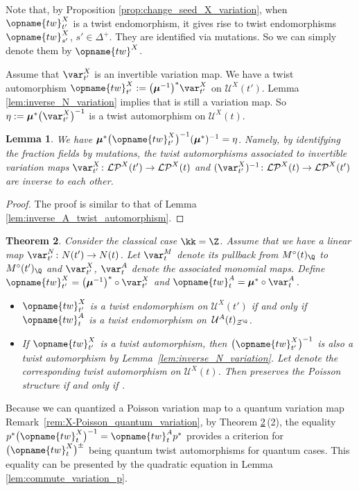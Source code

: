 \documentclass[pdftex]{sigma}
\renewcommand{\tw}{\opname{tw}}
\newcommand{\Mc}{M^\circ}
\newcommand{\upClAlg}{\mathcal{U}^A}
\newcommand{\XClAlg}{\mathcal{U}^X}
\newcommand{\LP}{{\mathcal{LP}}}
\newcommand{\fFac}{\mathcal{Z}}
\newcommand{\fFacRoot}{\fFac^{\Q}}
\newcommand{\seq}{\boldsymbol{\mu}}%
\renewcommand{\tw}{\opname{tw}}
\numberwithin{equation}{section}
\newtheorem{Theorem}{Theorem}[section]
\newtheorem{Lemma}[Theorem]{Lemma}
\begin{document}
Note that, by Proposition \ref{prop:change_seed_X_variation}, when
$\tw_{t'}^{X}$ is a twist endomorphism, it gives rise to twist endomorphisms
$\tw_{s'}^{X}$, $s'\in\Delta^{+}$. They are identified via mutations.
So we can simply denote them by $\tw^{X}$.

Assume that $\var_{t'}^{X}$ is an invertible variation map. We have
a twist automorphism $\tw_{t'}^{X}:=\big(\seq^{-1}\big)^{*}\var_{t'}^{X}$
on $\XClAlg(t')$. Lemma \ref{lem:inverse_N_variation} implies that
 is still a variation map. So $\eta:=\allowbreak\smash{\seq^{*}\bigl(\var_{t'}^{X}\bigr)^{-1}}$
is a twist automorphism on $\XClAlg(t)$.

\begin{Lemma}\label{lem:inverse_X_twist_automorphism}
We have $\seq^{*}\bigl(\tw_{t'}^{X}\bigr)^{-1}(\seq^{*})^{-1}=\eta$. Namely,
by identifying the fraction fields by mutations, the twist automorphisms
associated to invertible variation maps $\var_{t'}^{X}\colon\LP^{X}(t')\rightarrow\LP^{X}(t)$
and $(\var_{t'}^{X})^{-1}\colon\LP^{X}(t)\rightarrow\LP^{X}(t')$ are inverse
to each other.
\end{Lemma}

\begin{proof}
The proof is similar to that of Lemma \ref{lem:inverse_A_twist_automorphism}.
\end{proof}

\begin{Theorem}\label{thm:twist_X}
Consider the classical case $\kk=\Z$. Assume that we have a linear map $\var_{t'}^{N}\colon N(t')\rightarrow N(t)$.
Let $\var_{t}^{M}$ denote its pullback from $\Mc(t)_{\Q}$ to $\Mc(t')_{\Q}$ and $\var_{t'}^X$, $\var_t^A$ denote the associated monomial maps.
Define $\tw_{t'}^{X}=\big(\seq^{-1}\big)^{*}\circ\var_{t'}^{X}$ and $\tw_{t}^{A}=\seq^{*}\circ\var_{t}^{A}$.
\begin{itemize}\itemsep=0pt
\item[$(1)$] $\tw_{t'}^{X}$ is a twist endomorphism on $\XClAlg(t')$
if and only if $\tw_{t}^{A}$ is a twist endomorphism on~$\upClAlg(t)_{\fFacRoot}$.
\item[$(2)$] If $\tw_{t'}^{X}$ is a twist automorphism, then $\bigl(\tw_{t'}^{X}\bigr)^{-1}$
is also a twist automorphism by Lemma~{\rm \ref{lem:inverse_N_variation}}.
Let \smash{$\bigl(\tw_{t}^{X}\bigr)^{-1}:=\seq^{*}\bigl(\tw_{t'}^{X}\bigr)^{-1}(\seq^{*})^{-1}$}
denote the corresponding twist automorphism on $\XClAlg(t)$. Then
\smash{$\bigl(\tw_{t}^{X}\bigr)^{-1}$} preserves the Poisson structure if and only
if \smash{$p^{*}\bigl(\tw_{t}^{X}\bigr)^{-1}=\tw_{t}^{A}p^{*}$}.
\end{itemize}
\end{Theorem}
Because we can quantized a Poisson variation map to a quantum variation map Remark~\ref{rem:X-Poisson_quantum_variation}, by Theorem \ref{thm:twist_X}\,(2), the equality $p^{*}\bigl(\tw_{t}^{X}\bigr)^{-1}=\tw_{t}^{A}p^{*}$ provides a criterion for $\bigl(\tw_{t}^{X}\bigr)^\pm$ being quantum twist automorphisms for quantum cases. This equality can be presented by the quadratic equation in Lemma \ref{lem:commute_variation_p}.
\end{document}
